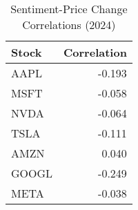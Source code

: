 \begin{table}[h!]
\centering
\caption{Sentiment-Price Change Correlations (2024)}
\label{tab:sentiment_price_correlations}
\begin{tabular}{lr}
\hline
Stock & Correlation \\
\hline
AAPL & -0.193 \\
MSFT & -0.058 \\
NVDA & -0.064 \\
TSLA & -0.111 \\
AMZN & 0.040 \\
GOOGL & -0.249 \\
META & -0.038 \\
\hline
\end{tabular}
\end{table}

